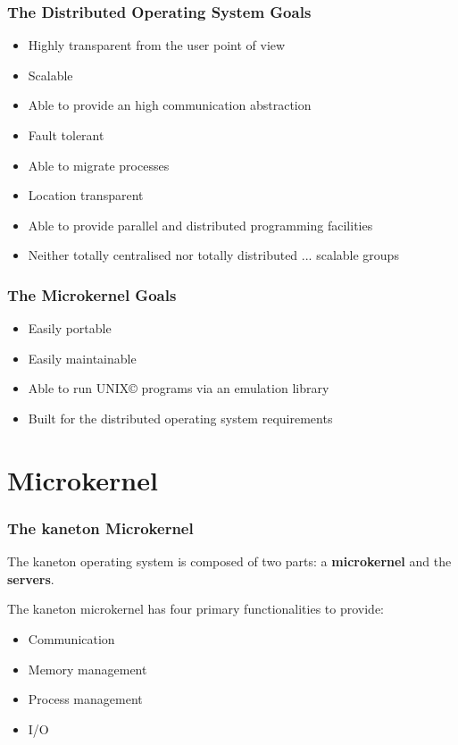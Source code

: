 
\begin{frame}
  \frametitle{The Distributed Operating System Goals}

  \begin{itemize}[<+->]
    \item
      Highly transparent from the user point of view
    \item
      Scalable
    \item
      Able to provide an high communication abstraction
    \item
      Fault tolerant
    \item
      Able to migrate processes
    \item
      Location transparent
    \item
      Able to provide parallel and distributed programming facilities
    \item
      Neither totally centralised nor totally distributed ...
      scalable groups
  \end{itemize}
\end{frame}


\begin{frame}
  \frametitle{The Microkernel Goals}

  \begin{itemize}[<+->]
    \item
      Easily portable
    \item
      Easily maintainable
    \item
      Able to run UNIX{\scriptsize \copyright} programs via
      an emulation library
    \item
      Built for the distributed operating system requirements
  \end{itemize}
\end{frame}

%
%

\section{Microkernel}


\begin{frame}
  \frametitle{The kaneton Microkernel}

  The kaneton operating system is composed of two parts: a
  \textbf{microkernel} and the \textbf{servers}.

  \nl

  The kaneton microkernel has four primary functionalities
  to provide:

  \begin{itemize}[<+->]
    \item
      Communication
    \item
      Memory management
    \item
      Process management
    \item
      I/O
  \end{itemize}
\end{frame}


